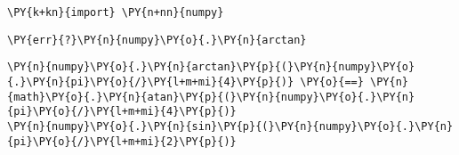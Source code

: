 {\par%
\vspace{-1\baselineskip}%
}%
\begin{notebookcell}[43]%
\begin{addmargin}[\cellleftmargin]{0em}%
{\smaller%
\par%
%
\vspace{-1\smallerfontscale}%
\begin{Verbatim}[commandchars=\\\{\}]
\PY{k+kn}{import} \PY{n+nn}{numpy}
\end{Verbatim}
%
\par%
\vspace{-1\smallerfontscale}}%
\end{addmargin}
\end{notebookcell}



{\par%
\vspace{-1\baselineskip}%
}%
\begin{notebookcell}[50]%
\begin{addmargin}[\cellleftmargin]{0em}%
{\smaller%
\par%
%
\vspace{-1\smallerfontscale}%
\begin{Verbatim}[commandchars=\\\{\}]
\PY{err}{?}\PY{n}{numpy}\PY{o}{.}\PY{n}{arctan}
\end{Verbatim}
%
\par%
\vspace{-1\smallerfontscale}}%
\end{addmargin}
\end{notebookcell}



{\par%
\vspace{-1\baselineskip}%
}%
\begin{notebookcell}[57]%
\begin{addmargin}[\cellleftmargin]{0em}%
{\smaller%
\par%
%
\vspace{-1\smallerfontscale}%
\begin{Verbatim}[commandchars=\\\{\}]
\PY{n}{numpy}\PY{o}{.}\PY{n}{arctan}\PY{p}{(}\PY{n}{numpy}\PY{o}{.}\PY{n}{pi}\PY{o}{/}\PY{l+m+mi}{4}\PY{p}{)} \PY{o}{==} \PY{n}{math}\PY{o}{.}\PY{n}{atan}\PY{p}{(}\PY{n}{numpy}\PY{o}{.}\PY{n}{pi}\PY{o}{/}\PY{l+m+mi}{4}\PY{p}{)}
\PY{n}{numpy}\PY{o}{.}\PY{n}{sin}\PY{p}{(}\PY{n}{numpy}\PY{o}{.}\PY{n}{pi}\PY{o}{/}\PY{l+m+mi}{2}\PY{p}{)}
\end{Verbatim}
%
\par%
\vspace{-1\smallerfontscale}}%
\end{addmargin}
\end{notebookcell}

